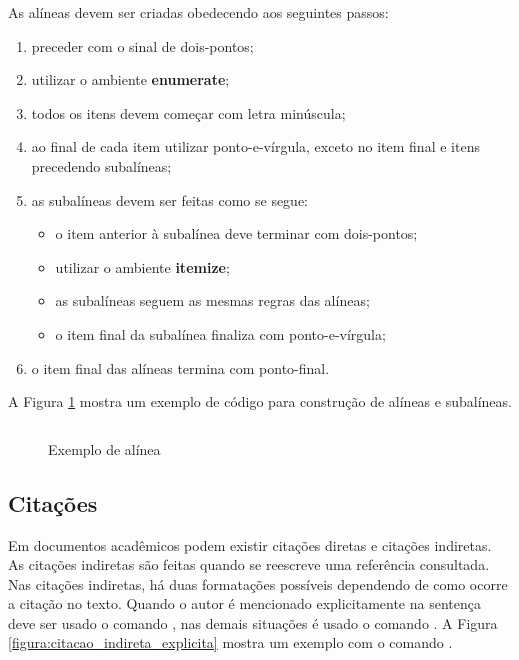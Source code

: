 \documentclass[artigo]{iftex2024}
\newcommand{\ElaboradoAutor}{Elaborado pelo autor, 2024.}
\begin{document}
As alíneas devem ser criadas obedecendo aos seguintes passos:
\begin{enumerate}
 \item preceder com o sinal de dois-pontos;
 \item utilizar o ambiente \textbf{enumerate};
 \item todos os itens devem começar com letra minúscula;
 \item ao final de cada item utilizar ponto-e-vírgula, exceto no item final e itens precedendo subalíneas;
 \item as subalíneas devem ser feitas como se segue:
 \begin{itemize}
  \item o item anterior à subalínea deve terminar com dois-pontos;
  \item utilizar o ambiente \textbf{itemize};
  \item as subalíneas seguem as mesmas regras das alíneas;
  \item o item final da subalínea finaliza com ponto-e-vírgula;
 \end{itemize}
 \item o item final das alíneas termina com ponto-final.
\end{enumerate}

A Figura \ref{fig:exemplo_alinea} mostra um exemplo de código para construção de alíneas e subalíneas.

\begin{figure}[!htb] \centering
\caption{Exemplo de alínea} \label{fig:exemplo_alinea}
\begin{varwidth}{\linewidth}
\inputminted{latex}{figuras/exemplo_alinea.tex}
\vspace{-1em}
\legend{\ElaboradoAutor}
\end{varwidth}
\end{figure}

\subsection{Citações}

Em documentos acadêmicos podem existir citações diretas e citações indiretas.
As citações indiretas são feitas quando se reescreve uma referência consultada.
Nas citações indiretas, há duas formatações possíveis dependendo de como ocorre a citação no texto.
Quando o autor é mencionado explicitamente na sentença deve ser usado o comando , nas demais situações é usado o comando .
A Figura \ref{figura:citacao_indireta_explicita} mostra um exemplo com o comando .
\end{document}
